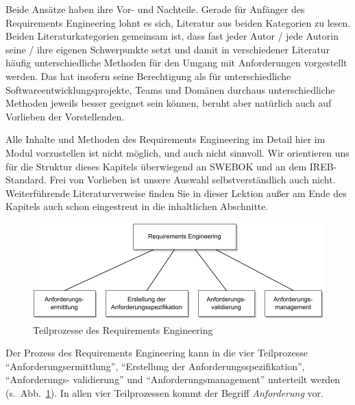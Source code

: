 Beide Ansätze haben ihre Vor- und Nachteile. Gerade für Anfänger des Requirements Engineering lohnt es sich, Literatur aus beiden Kategorien zu lesen. Beiden Literaturkategorien gemeinsam ist, dass fast jeder Autor / jede Autorin seine / ihre eigenen Schwerpunkte setzt und damit in verschiedener Literatur häufig unterschiedliche Methoden für den Umgang mit Anforderungen vorgestellt werden. Das hat insofern seine Berechtigung als für unterschiedliche Software\-entwicklungs\-projekte, Teams und Domänen durchaus unterschiedliche Methoden jeweils besser geeignet sein können, beruht aber natürlich auch auf Vorlieben der Vorstellenden. 

Alle Inhalte und Methoden des Requirements Engineering im Detail hier im Modul vorzustellen ist nicht möglich, und auch nicht sinnvoll. Wir orientieren uns für die Struktur dieses Kapitels überwiegend an SWEBOK und an dem IREB-Standard. Frei von Vorlieben ist unsere Auswahl selbstverständlich auch nicht. Weiterführende Literaturverweise finden Sie in dieser Lektion außer am Ende des Kapitels auch schon eingestreut in die inhaltlichen Abschnitte.

\vspace{\baselineskip} %

\begin{figure}[h!]
	\centering
	\includegraphics[width=\textwidth]{Bilder/Kapitel-6/aktivitaeten_requirements_engineering.pdf}
	\caption{Teilprozesse des Requirements Engineering}
	\label{fig:aktivitaeten_requirements_engineering}
\end{figure}

\vspace{\baselineskip} %

Der Prozess des Requirements Engineering kann in die vier Teilprozesse "`Anforderungsermittlung"', "`Erstellung der Anforderungsspezifikation"', "`Anforderungs-
\linebreak %
validierung"' und "`Anforderungsmanagement"' unterteilt werden (s.~Abb.~\ref{fig:aktivitaeten_requirements_engineering}). In allen vier Teilprozessen kommt der Begriff \textit{Anforderung} vor.

